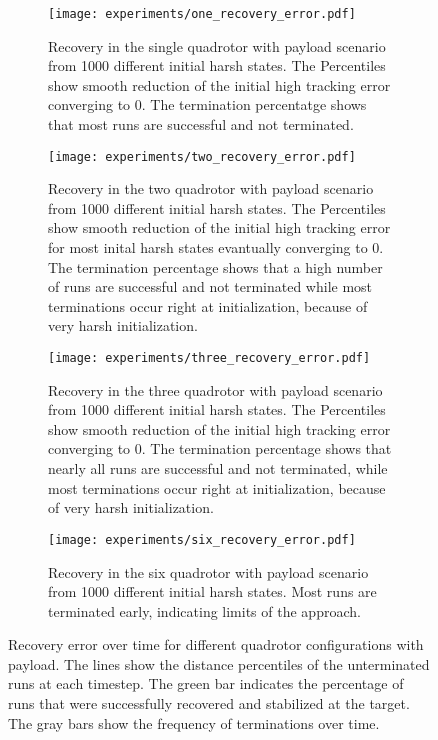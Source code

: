 \begin{figure}[H]
  \centering
  \begin{subfigure}[t]{0.49\textwidth}
    \texttt{[image: experiments/one\_recovery\_error.pdf]}
    \caption[Single quadrotor recovery evaluation]{Recovery in the single quadrotor with payload scenario from 1000 different initial harsh states. The Percentiles show smooth reduction of the initial high tracking error converging to 0. The termination percentatge shows that most runs are successful and not terminated.}
    \label{fig:payload_error_over_time_single}
  \end{subfigure}\hfill
  \begin{subfigure}[t]{0.49\textwidth}
    \texttt{[image: experiments/two\_recovery\_error.pdf]}
    \caption[Two quadrotor recovery evaluation]{Recovery in the two quadrotor with payload scenario from 1000 different initial harsh states. The Percentiles show smooth reduction of the initial high tracking error for most inital harsh states evantually converging to 0. The termination percentage shows that a high number of runs are successful and not terminated while most terminations occur right at initialization, because of very harsh initialization.}
    \label{fig:payload_error_over_time_two}
  \end{subfigure}

  \vspace{1em}  %
  \begin{subfigure}[t]{0.49\textwidth}
    \texttt{[image: experiments/three\_recovery\_error.pdf]}
    \caption[Three quadrotor recovery evaluation]{Recovery in the three quadrotor with payload scenario from 1000 different initial harsh states. The Percentiles show smooth reduction of the initial high tracking error converging to 0. The termination percentage shows that nearly all runs are successful and not terminated, while most terminations occur right at initialization, because of very harsh initialization.}
    \label{fig:payload_error_over_time_three}
  \end{subfigure}\hfill
  \begin{subfigure}[t]{0.49\textwidth}
    \texttt{[image: experiments/six\_recovery\_error.pdf]}
    \caption[Six quadrotor recovery evaluation]{Recovery in the six quadrotor with payload scenario from 1000 different initial harsh states. Most runs are terminated early, indicating limits of the approach.}
    \label{fig:payload_error_over_time_six}
  \end{subfigure}

  \caption[Recovery error comparison]{Recovery error over time for different quadrotor configurations with payload. The lines show the distance percentiles of the unterminated runs at each timestep. The green bar indicates the percentage of runs that were successfully recovered and stabilized at the target. The gray bars show the frequency of terminations over time.}
  \label{fig:single_quad_payload_subfigs}
\end{figure}



